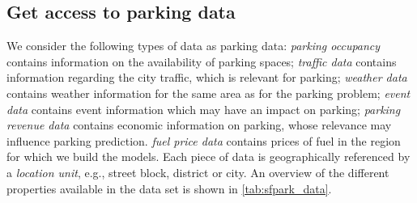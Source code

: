\documentclass{ws-ijait}
\begin{document}
	\subsection{Get access to parking data}
	We consider the following types of data as parking data: \textit{parking occupancy} contains information on the availability of parking spaces; \textit{traffic data} contains information regarding the city traffic, which is relevant for parking; \textit{weather data} contains weather information for the same area as for the parking problem; \textit{event data} contains event information which may have an impact on parking; \textit{parking revenue data} contains economic information on parking, whose relevance may influence parking prediction. \textit{fuel price data} contains prices of fuel in the region for which we build the models.
	Each piece of data is geographically referenced by a \textit{location unit}, e.g., street block, district or city. 
	An overview of the different properties available in the data set is shown in \cref{tab:sfpark_data}.
	
\end{document}
